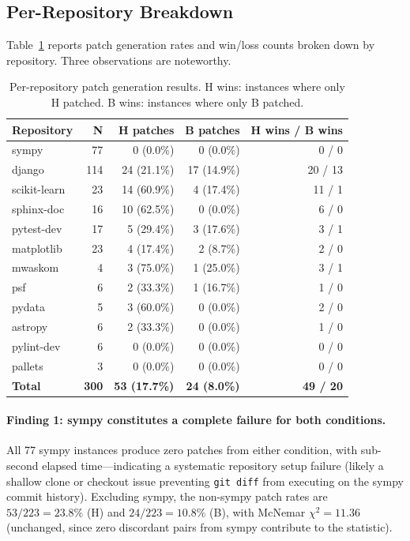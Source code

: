 \subsection{Per-Repository Breakdown}
\label{sec:results:per_repo}

Table~\ref{tab:per_repo} reports patch generation rates and win/loss counts
broken down by repository. Three observations are noteworthy.

\begin{table}[t]
\centering
\caption{Per-repository patch generation results. H wins: instances where
only H patched. B wins: instances where only B patched.}
\label{tab:per_repo}
\small
\begin{tabular}{lrrrr}
\toprule
\textbf{Repository} & \textbf{N} & \textbf{H patches} & \textbf{B patches} & \textbf{H wins / B wins} \\
\midrule
sympy       & 77  & 0 (0.0\%)   & 0 (0.0\%)   & 0 / 0 \\
django      & 114 & 24 (21.1\%) & 17 (14.9\%) & 20 / 13 \\
scikit-learn & 23 & 14 (60.9\%) & 4 (17.4\%)  & 11 / 1 \\
sphinx-doc  & 16  & 10 (62.5\%) & 0 (0.0\%)   & 6 / 0  \\
pytest-dev  & 17  & 5 (29.4\%)  & 3 (17.6\%)  & 3 / 1  \\
matplotlib  & 23  & 4 (17.4\%)  & 2 (8.7\%)   & 2 / 0  \\
mwaskom     & 4   & 3 (75.0\%)  & 1 (25.0\%)  & 3 / 1  \\
psf         & 6   & 2 (33.3\%)  & 1 (16.7\%)  & 1 / 0  \\
pydata      & 5   & 3 (60.0\%)  & 0 (0.0\%)   & 2 / 0  \\
astropy     & 6   & 2 (33.3\%)  & 0 (0.0\%)   & 1 / 0  \\
pylint-dev  & 6   & 0 (0.0\%)   & 0 (0.0\%)   & 0 / 0  \\
pallets     & 3   & 0 (0.0\%)   & 0 (0.0\%)   & 0 / 0  \\
\midrule
\textbf{Total} & \textbf{300} & \textbf{53 (17.7\%)} & \textbf{24 (8.0\%)} & \textbf{49 / 20} \\
\bottomrule
\end{tabular}
\end{table}

\paragraph{Finding 1: sympy constitutes a complete failure for both conditions.}
All 77 sympy instances produce zero patches from either condition, with
sub-second elapsed time---indicating a systematic repository setup failure
(likely a shallow clone or checkout issue preventing \texttt{git diff} from
executing on the sympy commit history). Excluding sympy, the non-sympy
patch rates are $53/223 = 23.8\%$ (H) and $24/223 = 10.8\%$ (B), with
McNemar $\chi^2 = 11.36$ (unchanged, since zero discordant pairs from sympy
contribute to the statistic).

